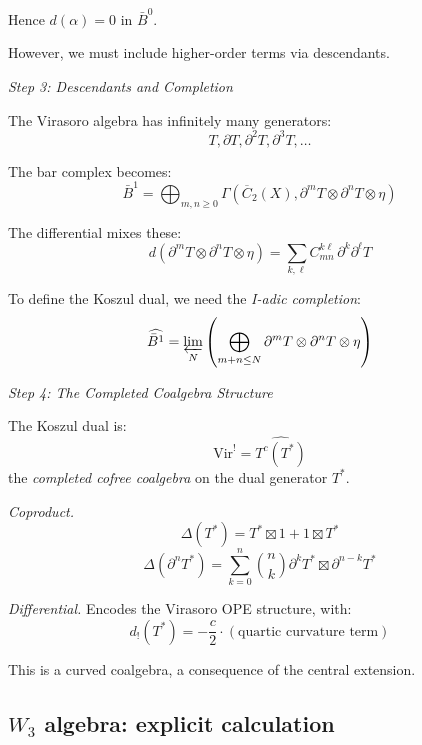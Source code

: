 \begin{example}
Hence $d(\alpha) = 0$ in $\bar{B}^0$.

However, we must include higher-order terms via descendants.

\medskip
\noindent\emph{Step 3: Descendants and Completion}

The Virasoro algebra has infinitely many generators:
\[T, \partial T, \partial^2 T, \partial^3 T, \ldots\]

The bar complex becomes:
\[\bar{B}^1 = \bigoplus_{m,n \geq 0} \Gamma(\overline{C}_2(X), \partial^m T \otimes \partial^n T \otimes \eta)\]

The differential mixes these:
\[d(\partial^m T \otimes \partial^n T \otimes \eta) = \sum_{k,\ell} C_{mn}^{k\ell} \, \partial^k \partial^\ell T\]

To define the Koszul dual, we need the \emph{I-adic completion}:
\[\widehat{\bar{B}^1} = \varprojlim_N \left(\bigoplus_{m+n \leq N} \partial^m T \otimes \partial^n T \otimes \eta\right)\]

\medskip
\noindent\emph{Step 4: The Completed Coalgebra Structure}

The Koszul dual is:
\[\text{Vir}^! = \widehat{T^c(T^*)}\]
the \emph{completed cofree coalgebra} on the dual generator $T^*$.

\emph{Coproduct.}
\[\Delta(T^*) = T^* \boxtimes 1 + 1 \boxtimes T^*\]
\[\Delta(\partial^n T^*) = \sum_{k=0}^n \binom{n}{k} \partial^k T^* \boxtimes \partial^{n-k} T^*\]

\emph{Differential.} Encodes the Virasoro OPE structure, with:
\[d_!(T^*) = -\frac{c}{2} \cdot (\text{quartic curvature term})\]

This is a curved coalgebra, a consequence of the central extension.
\end{example}


\subsection{\texorpdfstring{$W_3$ algebra: explicit calculation}{W-3 algebra: explicit calculation}}

